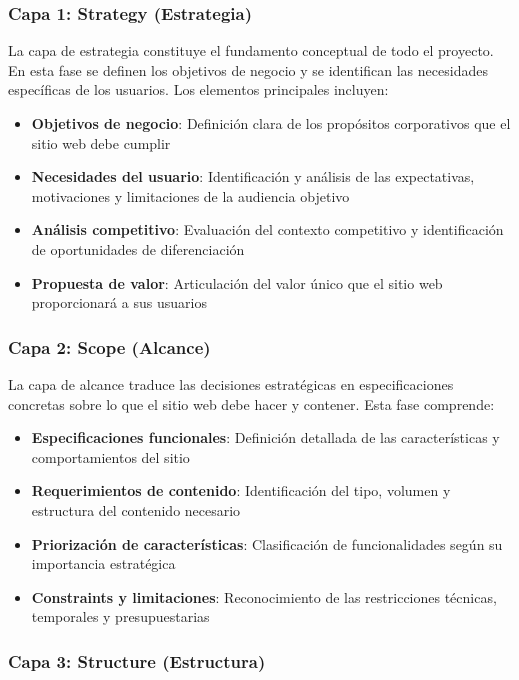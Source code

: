 \subsubsection{Capa 1: Strategy (Estrategia)}

La capa de estrategia constituye el fundamento conceptual de todo el proyecto. En esta fase se definen los objetivos de negocio y se identifican las necesidades específicas de los usuarios. Los elementos principales incluyen:

\begin{itemize}
    \item \textbf{Objetivos de negocio}: Definición clara de los propósitos corporativos que el sitio web debe cumplir
    \item \textbf{Necesidades del usuario}: Identificación y análisis de las expectativas, motivaciones y limitaciones de la audiencia objetivo
    \item \textbf{Análisis competitivo}: Evaluación del contexto competitivo y identificación de oportunidades de diferenciación
    \item \textbf{Propuesta de valor}: Articulación del valor único que el sitio web proporcionará a sus usuarios
\end{itemize}

\subsubsection{Capa 2: Scope (Alcance)}

La capa de alcance traduce las decisiones estratégicas en especificaciones concretas sobre lo que el sitio web debe hacer y contener. Esta fase comprende:

\begin{itemize}
    \item \textbf{Especificaciones funcionales}: Definición detallada de las características y comportamientos del sitio
    \item \textbf{Requerimientos de contenido}: Identificación del tipo, volumen y estructura del contenido necesario
    \item \textbf{Priorización de características}: Clasificación de funcionalidades según su importancia estratégica
    \item \textbf{Constraints y limitaciones}: Reconocimiento de las restricciones técnicas, temporales y presupuestarias
\end{itemize}

\subsubsection{Capa 3: Structure (Estructura)}

